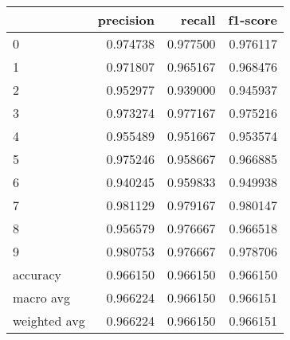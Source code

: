 \begin{tabular}{lrrr}
\toprule
 & precision & recall & f1-score \\
\midrule
0 & 0.974738 & 0.977500 & 0.976117 \\
1 & 0.971807 & 0.965167 & 0.968476 \\
2 & 0.952977 & 0.939000 & 0.945937 \\
3 & 0.973274 & 0.977167 & 0.975216 \\
4 & 0.955489 & 0.951667 & 0.953574 \\
5 & 0.975246 & 0.958667 & 0.966885 \\
6 & 0.940245 & 0.959833 & 0.949938 \\
7 & 0.981129 & 0.979167 & 0.980147 \\
8 & 0.956579 & 0.976667 & 0.966518 \\
9 & 0.980753 & 0.976667 & 0.978706 \\
accuracy & 0.966150 & 0.966150 & 0.966150 \\
macro avg & 0.966224 & 0.966150 & 0.966151 \\
weighted avg & 0.966224 & 0.966150 & 0.966151 \\
\bottomrule
\end{tabular}
